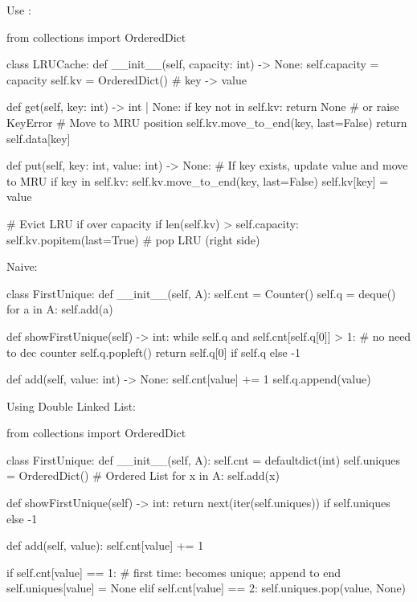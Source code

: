 Use :
\begin{python}
from collections import OrderedDict

class LRUCache:
    def __init__(self, capacity: int) -> None:
        self.capacity = capacity
        self.kv = OrderedDict()  # key -> value

    def get(self, key: int) -> int | None:
        if key not in self.kv:
            return None  # or raise KeyError
        # Move to MRU position
        self.kv.move_to_end(key, last=False)
        return self.data[key]

    def put(self, key: int, value: int) -> None:
        # If key exists, update value and move to MRU
        if key in self.kv:
            self.kv.move_to_end(key, last=False)
        self.kv[key] = value

        # Evict LRU if over capacity
        if len(self.kv) > self.capacity:
            self.kv.popitem(last=True)   # pop LRU (right side)
\end{python}


Naive:
\begin{python}
class FirstUnique:
  def __init__(self, A):
    self.cnt = Counter()
    self.q = deque()
    for a in A:
      self.add(a)

  def showFirstUnique(self) -> int:
    while self.q and self.cnt[self.q[0]] > 1:
      # no need to dec counter
      self.q.popleft()
    return self.q[0] if self.q else -1

  def add(self, value: int) -> None:
    self.cnt[value] += 1
    self.q.append(value)
\end{python}

Using Double Linked List:
\begin{python}
from collections import OrderedDict

class FirstUnique:
  def __init__(self, A):
    self.cnt = defaultdict(int)
    self.uniques = OrderedDict()   # Ordered List
    for x in A:
      self.add(x)

  def showFirstUnique(self) -> int:
    return next(iter(self.uniques)) if self.uniques else -1

  def add(self, value):
    self.cnt[value] += 1

    if self.cnt[value] == 1:
      # first time: becomes unique; append to end
      self.uniques[value] = None
    elif self.cnt[value] == 2:
      self.uniques.pop(value, None)
\end{python}

